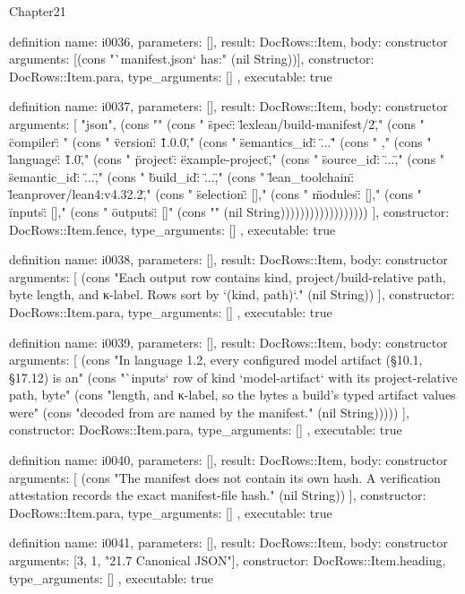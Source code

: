 \begin{lexlean}{Chapter21}
\begin{semanticmodule}
definition{
  name: i0036,
  parameters: [],
  result: DocRows::Item,
  body: constructor{
    arguments: [(cons "`manifest.json` has:" (nil String))],
    constructor: DocRows::Item.para,
    type_arguments: []
  },
  executable: true
}

definition{
  name: i0037,
  parameters: [],
  result: DocRows::Item,
  body: constructor{
    arguments: [
      "json",
      (cons "{" (cons "  \"spec\": \"lexlean/build-manifest/2\"," (cons "  \"compiler\": {" (cons "    \"version\": \"1.0.0\"," (cons "    \"semantics_id\": \"...\"" (cons "  }," (cons "  \"language\": \"1.0\"," (cons "  \"project\": \"example-project\"," (cons "  \"source_id\": \"...\"," (cons "  \"semantic_id\": \"...\"," (cons "  \"build_id\": \"...\"," (cons "  \"lean_toolchain\": \"leanprover/lean4:v4.32.2\"," (cons "  \"selection\": []," (cons "  \"modules\": []," (cons "  \"inputs\": []," (cons "  \"outputs\": []" (cons "}" (nil String))))))))))))))))))
    ],
    constructor: DocRows::Item.fence,
    type_arguments: []
  },
  executable: true
}

definition{
  name: i0038,
  parameters: [],
  result: DocRows::Item,
  body: constructor{
    arguments: [
      (cons "Each output row contains kind, project/build-relative path, byte length, and κ-label. Rows sort by `(kind, path)`." (nil String))
    ],
    constructor: DocRows::Item.para,
    type_arguments: []
  },
  executable: true
}

definition{
  name: i0039,
  parameters: [],
  result: DocRows::Item,
  body: constructor{
    arguments: [
      (cons "In language 1.2, every configured model artifact (§10.1, §17.12) is an" (cons "`inputs` row of kind `model-artifact` with its project-relative path, byte" (cons "length, and κ-label, so the bytes a build's typed artifact values were" (cons "decoded from are named by the manifest." (nil String)))))
    ],
    constructor: DocRows::Item.para,
    type_arguments: []
  },
  executable: true
}

definition{
  name: i0040,
  parameters: [],
  result: DocRows::Item,
  body: constructor{
    arguments: [
      (cons "The manifest does not contain its own hash. A verification attestation records the exact manifest-file hash." (nil String))
    ],
    constructor: DocRows::Item.para,
    type_arguments: []
  },
  executable: true
}

definition{
  name: i0041,
  parameters: [],
  result: DocRows::Item,
  body: constructor{
    arguments: [3, 1, "21.7 Canonical JSON"],
    constructor: DocRows::Item.heading,
    type_arguments: []
  },
  executable: true
}


\end{semanticmodule}
\end{lexlean}
